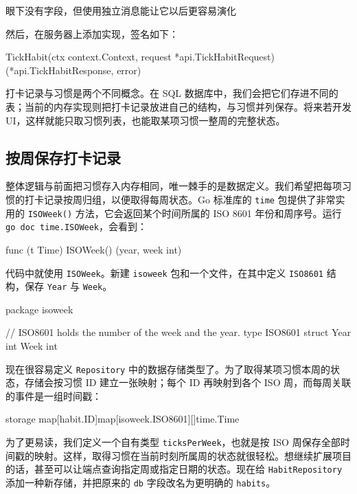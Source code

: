 \begin{codeannotations}
\item 眼下没有字段，但使用独立消息能让它以后更容易演化
\end{codeannotations}

然后，在服务器上添加实现，签名如下：

\begin{gocode}[]
TickHabit(ctx context.Context, request *api.TickHabitRequest)
    (*api.TickHabitResponse, error)
\end{gocode}

打卡记录与习惯是两个不同概念。在 SQL 数据库中，我们会把它们存进不同的表；当前的内存实现则把打卡记录放进自己的结构，与习惯并列保存。将来若开发 UI，这样就能只取习惯列表，也能取某项习惯一整周的完整状态。

\subsection{按周保存打卡记录}

整体逻辑与前面把习惯存入内存相同，唯一棘手的是数据定义。我们希望把每项习惯的打卡记录按周归组，以便取得每周状态。Go 标准库的 \texttt{time} 包提供了非常实用的 \texttt{ISOWeek()} 方法，它会返回某个时间所属的 ISO 8601 年份和周序号。运行 \texttt{go doc time.ISOWeek}，会看到：

\begin{gocode}[]
func (t Time) ISOWeek() (year, week int)
\end{gocode}

代码中就使用 \texttt{ISOWeek}。新建 \texttt{isoweek} 包和一个文件，在其中定义 \texttt{ISO8601} 结构，保存 \texttt{Year} 与 \texttt{Week}。

\begin{gocode}[title={代码清单 10.34 \texttt{isoweek/isoweek.go}：\texttt{ISO8601} 结构}]
package isoweek

// ISO8601 holds the number of the week and the year.
type ISO8601 struct {
    Year int
    Week int
}
\end{gocode}

现在很容易定义 \texttt{Repository} 中的数据存储类型了。为了取得某项习惯本周的状态，存储会按习惯 ID 建立一张映射；每个 ID 再映射到各个 ISO 周，而每周关联的事件是一组时间戳：

\begin{gocode}[]
storage map[habit.ID]map[isoweek.ISO8601][]time.Time
\end{gocode}

为了更易读，我们定义一个自有类型 \texttt{ticksPerWeek}，也就是按 ISO 周保存全部时间戳的映射。这样，取得习惯在当前时刻所属周的状态就很轻松。想继续扩展项目的话，甚至可以让端点查询指定周或指定日期的状态。现在给 \texttt{HabitRepository} 添加一种新存储，并把原来的 \texttt{db} 字段改名为更明确的 \texttt{habits}。

